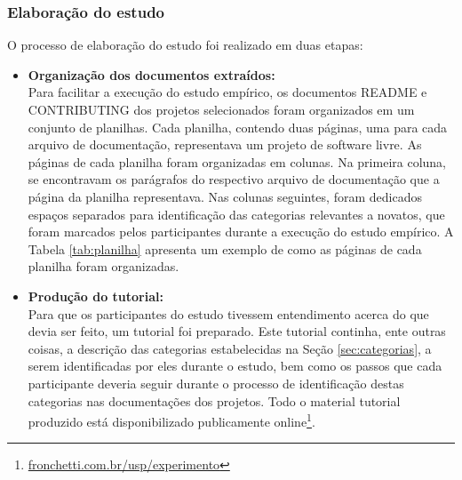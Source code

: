 \subsubsection{Elaboração do estudo}
O processo de elaboração do estudo foi realizado em duas etapas:
\begin{itemize}
    \item \textbf{Organização dos documentos extraídos:}\\
    Para facilitar a execução do estudo empírico, os documentos README e CONTRIBUTING dos projetos selecionados foram organizados em um conjunto de planilhas. Cada planilha, contendo duas páginas, uma para cada arquivo de documentação, representava um projeto de software livre. As páginas de cada planilha foram organizadas em colunas. Na primeira coluna, se encontravam os parágrafos do respectivo arquivo de documentação que a página da planilha representava. Nas colunas seguintes, foram dedicados espaços separados para identificação das categorias relevantes a novatos, que foram marcados pelos participantes durante a execução do estudo empírico. A Tabela \ref{tab:planilha} apresenta um exemplo de como as páginas de cada planilha foram organizadas.
    
    \item \textbf{Produção do tutorial:}\\ 
    Para que os participantes do estudo tivessem entendimento acerca do que devia ser feito, um tutorial foi preparado. Este tutorial continha, ente outras coisas, a descrição das categorias estabelecidas na Seção \ref{sec:categorias}, a serem identificadas por eles durante o estudo, bem como os passos que cada participante deveria seguir durante o processo de identificação destas categorias nas documentações dos projetos. Todo o material tutorial produzido está disponibilizado publicamente online\footnote{\url{fronchetti.com.br/usp/experimento}}.
\end{itemize}

